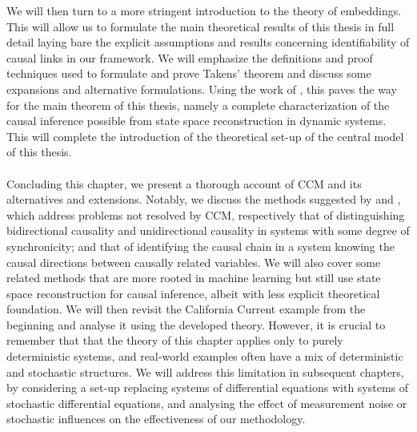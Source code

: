 \documentclass[11pt, a4paper]{memoir}
\theoremstyle{plain}
\theoremstyle{definition}
\begin{document}
We will then turn to a more stringent introduction to the theory of embeddings. This will allow us to formulate the main theoretical results of this thesis in full detail laying bare the explicit assumptions and results concerning identifiability of causal links in our framework. We will emphasize the definitions and proof techniques used to formulate and prove Takens' theorem and discuss some expansions and alternative formulations. Using the work of \cite{mathFound}, this paves the way for the main theorem of this thesis, namely a complete characterization of the causal inference possible from state space reconstruction in dynamic systems. This will complete the introduction of the theoretical set-up of the central model of this thesis.\\\\
Concluding this chapter, we present a thorough account of CCM and its alternatives and extensions. Notably, we discuss the methods suggested by \cite{Ye2015} and \cite{Leng2020}, which address problems not resolved by CCM, respectively that of distinguishing bidirectional causality and unidirectional causality in systems with some degree of synchronicity; and that of identifying the causal chain in a system knowing the causal directions between causally related variables. We will also cover some related methods that are more rooted in machine learning but still use state space reconstruction for causal inference, albeit with less explicit theoretical foundation. We will then revisit the California Current example from the beginning and analyse it using the developed theory. However, it is crucial to remember that that the theory of this chapter applies only to purely deterministic systems, and real-world examples often have a mix of deterministic and stochastic structures. We will address this limitation in subsequent chapters, by considering a set-up replacing systems of differential equations with systems of stochastic differential equations, and analysing the effect of measurement noise or stochastic influences on the effectiveness of our methodology.
\newpage
\end{document}
